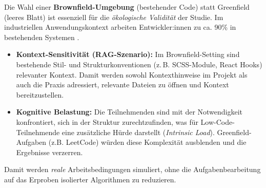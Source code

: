 Die Wahl einer  \textbf{Brownfield-Umgebung} (bestehender Code) statt Greenfield (leeres Blatt) ist essenziell für die \emph{ökologische Validität} der Studie.
Im industriellen Anwendungskontext arbeiten Entwickler:innen zu ca. 90\% in bestehenden Systemen \parencite{brandtner2024brownfield}.
\begin{itemize}
    \item  \textbf{Kontext-Sensitivität (RAG-Szenario):} Im Brownfield-Setting sind bestehende Stil- und Strukturkonventionen (z.\,B. SCSS-Module, React Hooks) relevanter Kontext. Damit werden sowohl Kontexthinweise im Projekt als auch die Praxis adressiert, relevante Dateien zu öffnen und Kontext bereitzustellen.
    \item  \textbf{Kognitive Belastung:} Die Teilnehmenden sind mit der Notwendigkeit konfrontiert, sich in der Struktur zurechtzufinden, was für Low-Code-Teilnehmende eine zusätzliche Hürde darstellt (\emph{Intrinsic Load}). Greenfield-Aufgaben (z.B. LeetCode) würden diese Komplexität ausblenden und die Ergebnisse verzerren.
\end{itemize}
Damit werden \emph{reale} Arbeitsbedingungen simuliert, ohne die Aufgabenbearbeitung auf das Erproben isolierter Algorithmen zu reduzieren.

